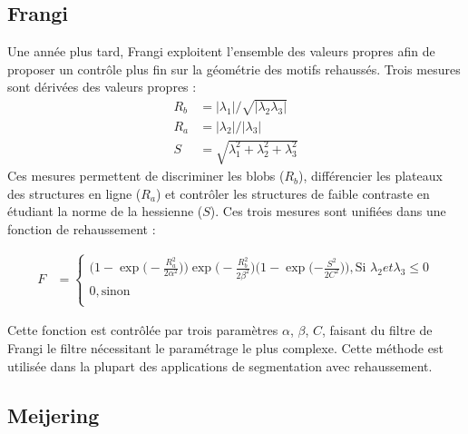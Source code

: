 \subsection{Frangi}

Une année plus tard, Frangi \etal \cite{Frangi1998_vesselness} exploitent l'ensemble des valeurs propres afin de proposer un contrôle plus fin sur la géométrie des motifs rehaussés. Trois mesures sont dérivées des valeurs propres :
\begin{align}
 \nonumber
  R_b & = |\lambda_1| / \sqrt{|\lambda_2\lambda_3|}\\
R_a & = |\lambda_2| / |\lambda_3| \nonumber\\
S & = \sqrt{\lambda^2_1 + \lambda^2_2 + \lambda^2_3} \nonumber
\end{align}
Ces mesures permettent de discriminer les blobs ($R_b$), différencier les plateaux des structures en ligne ($R_a$) et contrôler les structures de faible contraste en étudiant la norme de la hessienne ($S$). Ces trois mesures sont unifiées dans une fonction de rehaussement :   

\begin{align}
  F & = \begin{cases} 
                \big(1-\exp\big(-\frac{R_a^2}{2\alpha^2}\big)\big) \exp\big(-\frac{R_b^2}{2\beta^2}\big)\big(1-\exp(-\frac{S^2}{2C^2}\big)\big), \text{Si~} \lambda_2 et \lambda_3 \leqslant 0   \\
                0, \text{sinon} \\
              \end{cases}
\end{align}

Cette fonction est contrôlée par trois paramètres $\alpha$, $\beta$, $C$, faisant du filtre de Frangi le filtre nécessitant le paramétrage le plus complexe. Cette méthode est utilisée dans la plupart des applications de segmentation avec rehaussement.

\subsection{Meijering}

